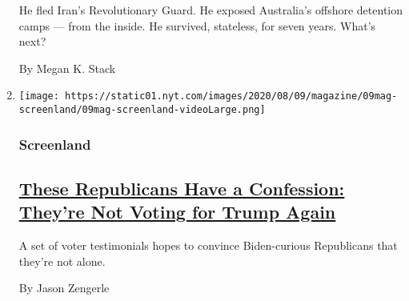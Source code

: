 \begin{enumerate}
  He fled Iran's Revolutionary Guard. He exposed Australia's offshore
  detention camps --- from the inside. He survived, stateless, for seven
  years. What's next?

  By Megan K. Stack
\item
  \texttt{[image: https://static01.nyt.com/images/2020/08/09/magazine/09mag-screenland/09mag-screenland-videoLarge.png]}

  \hypertarget{screenland}{%
  \subsubsection{Screenland}\label{screenland}}

  \hypertarget{these-republicans-have-a-confession-theyre-not-voting-for-trump-again}{%
  \subsection{\texorpdfstring{\href{/2020/08/05/magazine/republicans-confess-against-trump.html}{These
  Republicans Have a Confession: They're Not Voting for Trump
  Again}}{These Republicans Have a Confession: They're Not Voting for Trump Again}}\label{these-republicans-have-a-confession-theyre-not-voting-for-trump-again}}

  A set of voter testimonials hopes to convince Biden-curious
  Republicans that they're not alone.

  By Jason Zengerle
\end{enumerate}

